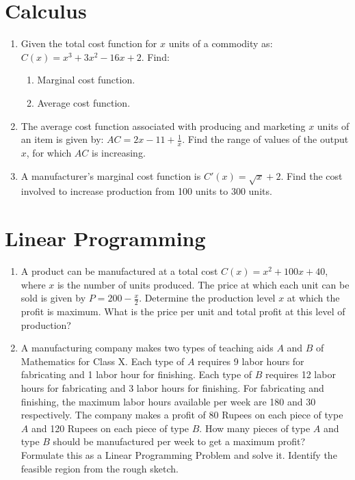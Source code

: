 \documentclass[a4paper,12pt]{article}
\begin{document}
\section{Calculus}


\begin{enumerate}


		\item Given the total cost function for $x$ units of a commodity as:
        $ C(x) = x^3 + 3x^2 - 16x + 2. $
        Find:
        \begin{enumerate}
            \item Marginal cost function.
            \item Average cost function.
        \end{enumerate}
        

		\item The average cost function associated with producing and marketing $x$ units of an item is given by:
        $ AC = 2x - 11 + \frac{1}{x}. $
        Find the range of values of the output $x$, for which $AC$ is increasing.

	\item A manufacturer’s marginal cost function is $C'(x) = \sqrt{x} + 2$. Find the cost involved to increase production from 100 units to 300 units.
\end{enumerate}

\section{Linear Programming}

\begin{enumerate}

		\item A product can be manufactured at a total cost $C(x) = x^2 + 100x + 40$, where $x$ is the number of units produced. The price at which each unit can be sold is given by $P = 200 - \frac{x}{2}$. Determine the production level $x$ at which the profit is maximum. What is the price per unit and total profit at this level of production?
        
			\item
    A manufacturing company makes two types of teaching aids $A$ and $B$ of Mathematics for Class X. Each type of $A$ requires 9 labor hours for fabricating and 1 labor hour for finishing. Each type of $B$ requires 12 labor hours for fabricating and 3 labor hours for finishing. For fabricating and finishing, the maximum labor hours available per week are 180 and 30 respectively. The company makes a profit of 80 Rupees on each piece of type $A$ and 120 Rupees on each piece of type $B$. How many pieces of type $A$ and type $B$ should be manufactured per week to get a maximum profit? Formulate this as a Linear Programming Problem and solve it. Identify the feasible region from the rough sketch.
\end{enumerate}
\end{document}
